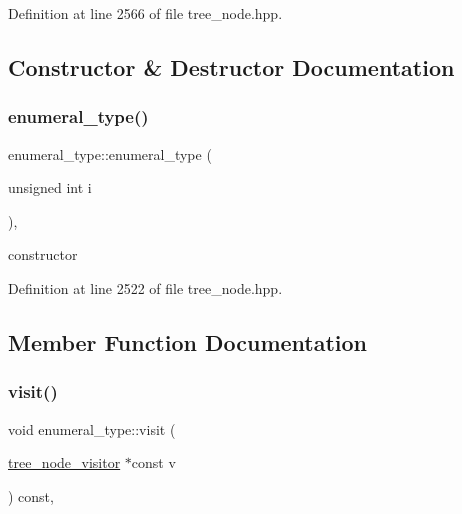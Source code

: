 Definition at line 2566 of file tree\+\_\+node.\+hpp.



\subsection{Constructor \& Destructor Documentation}
\mbox{\label{structenumeral__type_a5ee660323814a50840634379df3f318f}} 
\subsubsection{\texorpdfstring{enumeral\+\_\+type()}{enumeral\_type()}}
{\footnotesize\ttfamily enumeral\+\_\+type\+::enumeral\+\_\+type (\begin{DoxyParamCaption}\item[{unsigned int}]{i }\end{DoxyParamCaption})\hspace{0.3cm}{\ttfamily [inline]}, {\ttfamily [explicit]}}



constructor 



Definition at line 2522 of file tree\+\_\+node.\+hpp.



\subsection{Member Function Documentation}
\mbox{\label{structenumeral__type_ab9c53d590b11d386a0791a0b211a5b1f}} 
\subsubsection{\texorpdfstring{visit()}{visit()}}
{\footnotesize\ttfamily void enumeral\+\_\+type\+::visit (\begin{DoxyParamCaption}\item[{\hyperlink{classtree__node__visitor}{tree\+\_\+node\+\_\+visitor} $\ast$const}]{v }\end{DoxyParamCaption}) const\hspace{0.3cm}{\ttfamily [override]}, {\ttfamily [virtual]}}



